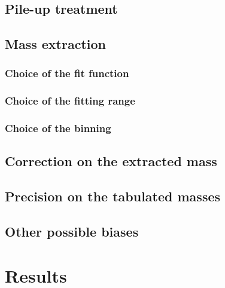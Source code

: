\subsection{Pile-up treatment}

\subsection{Mass extraction}

\subsubsection{Choice of the fit function}

\subsubsection{Choice of the fitting range}

\subsubsection{Choice of the binning}

\subsection{Correction on the extracted mass}

\subsection{Precision on the tabulated masses}

\subsection{Other possible biases}

\section{Results}
